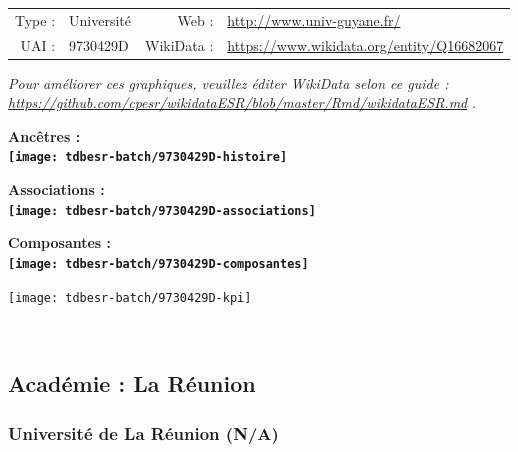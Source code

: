 \documentclass[12pt,french,]{article}
\begin{document}
\begin{tabular*}{\textwidth}{rp{5cm}rl}  
\hline  
Type : & Université & Web : &\href{http://www.univ-guyane.fr/}{http://www.univ-guyane.fr/} \\  
UAI : & 9730429D & WikiData : & \href{https://www.wikidata.org/entity/Q16682067}{https://www.wikidata.org/entity/Q16682067} \\  
\hline  
\end{tabular*}

\textit{\scriptsize Pour améliorer ces graphiques, veuillez éditer WikiData selon ce guide :  \href{https://github.com/cpesr/wikidataESR/blob/master/Rmd/wikidataESR.md}{https://github.com/cpesr/wikidataESR/blob/master/Rmd/wikidataESR.md}}
.

\vspace{1cm}  
\begin{minipage}[b]{0.50\textwidth}\begin{center} \bf Ancêtres : \\  
\texttt{[image: tdbesr-batch/9730429D-histoire]} \end{center}\end{minipage}\begin{minipage}[b]{0.50\textwidth}\begin{center} \bf Associations : \\  
\texttt{[image: tdbesr-batch/9730429D-associations]} \end{center}\end{minipage}

\hrulefill

\begin{center} \bf Composantes : \\  
\texttt{[image: tdbesr-batch/9730429D-composantes]} \end{center}

\begin{center}\texttt{[image: tdbesr-batch/9730429D-kpi]} \end{center}\checkoddpage

\ifoddpage \fi ~\newpage  

\hypertarget{acaduxe9mie-la-ruxe9union}{%
\subsection{Académie : La Réunion}\label{acaduxe9mie-la-ruxe9union}}

\hypertarget{universituxe9-de-la-ruxe9union-na}{%
\subsubsection{Université de La Réunion
(N/A)}\label{universituxe9-de-la-ruxe9union-na}}
\end{document}

